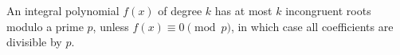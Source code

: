 An integral polynomial $f(x)$ of degree $k$ has at most $k$ incongruent roots modulo a prime $p$, unless $f(x) \equiv 0 \pmod{p}$, in which case all coefficients are divisible by $p$.
